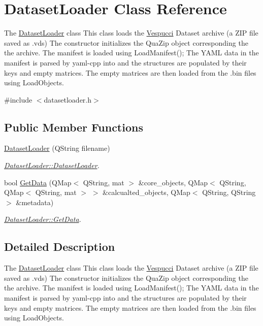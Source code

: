 \hypertarget{class_dataset_loader}{}\section{Dataset\+Loader Class Reference}
\label{class_dataset_loader}


The \hyperlink{class_dataset_loader}{Dataset\+Loader} class This class loads the \hyperlink{namespace_vespucci}{Vespucci} Dataset archive (a Z\+IP file saved as .vds) The constructor initializes the Qua\+Zip object corresponding the the archive. The manifest is loaded using Load\+Manifest(); The Y\+A\+ML data in the manifest is parsed by yaml-\/cpp into and the structures are populated by their keys and empty matrices. The empty matrices are then loaded from the .bin files using Load\+Objects.  




{\ttfamily \#include $<$datasetloader.\+h$>$}

\subsection*{Public Member Functions}
\begin{DoxyCompactItemize}
\item 
\hyperlink{class_dataset_loader_ab5fb686a79243a7335fa72ed708a7c7e}{Dataset\+Loader} (Q\+String filename)
\begin{DoxyCompactList}\small\item\em \hyperlink{class_dataset_loader_ab5fb686a79243a7335fa72ed708a7c7e}{Dataset\+Loader\+::\+Dataset\+Loader}. \end{DoxyCompactList}\item 
bool \hyperlink{class_dataset_loader_a7d541be8857c2187a2145d15c1d91346}{Get\+Data} (Q\+Map$<$ Q\+String, mat $>$ \&core\+\_\+objects, Q\+Map$<$ Q\+String, Q\+Map$<$ Q\+String, mat $>$ $>$ \&calcualted\+\_\+objects, Q\+Map$<$ Q\+String, Q\+String $>$ \&metadata)
\begin{DoxyCompactList}\small\item\em \hyperlink{class_dataset_loader_a7d541be8857c2187a2145d15c1d91346}{Dataset\+Loader\+::\+Get\+Data}. \end{DoxyCompactList}\end{DoxyCompactItemize}


\subsection{Detailed Description}
The \hyperlink{class_dataset_loader}{Dataset\+Loader} class This class loads the \hyperlink{namespace_vespucci}{Vespucci} Dataset archive (a Z\+IP file saved as .vds) The constructor initializes the Qua\+Zip object corresponding the the archive. The manifest is loaded using Load\+Manifest(); The Y\+A\+ML data in the manifest is parsed by yaml-\/cpp into and the structures are populated by their keys and empty matrices. The empty matrices are then loaded from the .bin files using Load\+Objects. 

